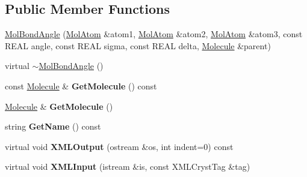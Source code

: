 \subsection*{Public Member Functions}
\begin{DoxyCompactItemize}
\item 
\mbox{\hyperlink{class_obj_cryst_1_1_mol_bond_angle_a3707f7b1b608c105ba7ee98cab7a87ed}{Mol\+Bond\+Angle}} (\mbox{\hyperlink{class_obj_cryst_1_1_mol_atom}{Mol\+Atom}} \&atom1, \mbox{\hyperlink{class_obj_cryst_1_1_mol_atom}{Mol\+Atom}} \&atom2, \mbox{\hyperlink{class_obj_cryst_1_1_mol_atom}{Mol\+Atom}} \&atom3, const R\+E\+AL angle, const R\+E\+AL sigma, const R\+E\+AL delta, \mbox{\hyperlink{class_obj_cryst_1_1_molecule}{Molecule}} \&parent)
\item 
virtual \mbox{\hyperlink{class_obj_cryst_1_1_mol_bond_angle_aeaaf746bb55510479c05a908054b5017}{$\sim$\+Mol\+Bond\+Angle}} ()
\item 
\mbox{\label{class_obj_cryst_1_1_mol_bond_angle_ad59080229c0f85842b279f4d86c69721}} 
const \mbox{\hyperlink{class_obj_cryst_1_1_molecule}{Molecule}} \& {\bfseries Get\+Molecule} () const
\item 
\mbox{\label{class_obj_cryst_1_1_mol_bond_angle_ab5111f482906db1af7eda328467e4b25}} 
\mbox{\hyperlink{class_obj_cryst_1_1_molecule}{Molecule}} \& {\bfseries Get\+Molecule} ()
\item 
\mbox{\label{class_obj_cryst_1_1_mol_bond_angle_a528730680dedb535c8d2a90a6d57fa30}} 
string {\bfseries Get\+Name} () const
\item 
\mbox{\label{class_obj_cryst_1_1_mol_bond_angle_aafeddaf4be332712a86a3f284c950364}} 
virtual void {\bfseries X\+M\+L\+Output} (ostream \&os, int indent=0) const
\item 
\mbox{\label{class_obj_cryst_1_1_mol_bond_angle_a5e3270e5dea851513beabc58f58018eb}} 
virtual void {\bfseries X\+M\+L\+Input} (istream \&is, const X\+M\+L\+Cryst\+Tag \&tag)
\item 
\mbox{\label{class_obj_cryst_1_1_mol_bond_angle_a0202c5e8b963db90f261240681f8e945}} 

\end{DoxyCompactItemize}
